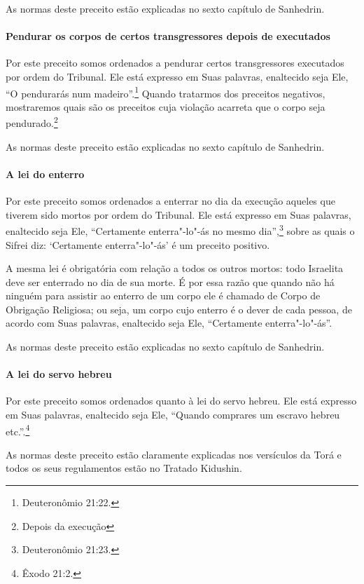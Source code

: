 \begin{multicols}{2}
As normas deste preceito estão explicadas no sexto capítulo de Sanhedrin\starr.


\paragraph{Pendurar os corpos de certos transgressores depois de executados}

Por este preceito somos ordenados a pendurar certos transgressores
executados por ordem do Tribunal. Ele está expresso em Suas palavras,
enaltecido seja Ele, ``O pendurarás num madeiro''.\footnote{Deuteronômio 21:22.}
Quando tratarmos dos preceitos negativos, mostraremos quais são os
preceitos cuja violação acarreta que o corpo seja
pendurado.\footnote{Depois da execução}

As normas deste preceito estão explicadas no sexto capítulo de Sanhedrin\starr.

\paragraph{A lei do enterro}

Por este preceito somos ordenados a enterrar no dia da execução aqueles
que tiverem sido mortos por ordem do Tribunal. Ele está expresso em Suas
palavras, enaltecido seja Ele, ``Certamente enterra"-lo"-ás no mesmo dia'',\footnote{Deuteronômio 21:23.} sobre as quais o Sifrei\starr{} diz: `Certamente
enterra"-lo"-ás' é um preceito positivo.

A mesma lei é obrigatória com relação a todos os outros mortos: todo
Israelita deve ser enterrado no dia de sua morte. É por essa razão que
quando não há ninguém para assistir ao enterro de um corpo ele é
chamado de Corpo de Obrigação Religiosa; ou seja, um corpo cujo enterro
é o dever de cada pessoa, de acordo com Suas palavras, enaltecido seja
Ele, ``Certamente enterra"-lo"-ás''.

As normas deste preceito estão explicadas no sexto capítulo de Sanhedrin\starr.

\paragraph{A lei do servo hebreu}

Por este preceito somos ordenados quanto à lei do servo hebreu. Ele está
expresso em Suas palavras, enaltecido seja Ele, ``Quando comprares um
escravo hebreu etc.''.\footnote{Êxodo 21:2.}

As normas deste preceito estão claramente explicadas nos versículos da
Torá\starr{} e todos os seus regulamentos estão no Tratado Kidushin\starr.


\end{multicols}
